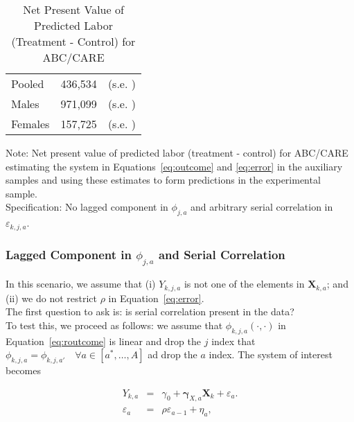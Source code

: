 \begin{table}[H] 
\begin{threeparttable}
\caption{Net Present Value of Predicted Labor (Treatment - Control) for ABC/CARE}
\label{table:yourlabel}
\centering 
\begin{tabular}{lcc} \toprule
Pooled & 436,534 & (s.e. ) \\
Males & 971,099 & (s.e. ) \\ 
Females & 157,725 & (s.e. ) \\ \bottomrule
\end{tabular}
\end{threeparttable}
\end{table}
\begin{spacing}{1}
\begin{footnotesize}
\noindent Note: Net present value of predicted labor (treatment - control) for ABC/CARE estimating the system in Equations~\eqref{eq:outcome} and \eqref{eq:error} in the auxiliary samples and using these estimates to form predictions in the experimental sample.\\ 
\noindent Specification: No lagged component in $\phi_{j,a}$ and arbitrary serial correlation in $\varepsilon_{k,j,a}$. 
\end{footnotesize}
\end{spacing}



\subsubsection{Lagged Component in $\phi_{j,a}$ and Serial Correlation} 

\noindent In this scenario, we assume that (i)  $Y_{k,j,a}$ is not one of the elements in $\bm{X}_{k,a}$; and (ii) we do not restrict $\rho$ in Equation~\eqref{eq:error}.\\

\noindent The first question to ask is: is serial correlation present in the data?\\ 

\noindent To test this, we proceed as follows: we assume that $\phi_{k,j,a} \left( \cdot, \cdot \right)$ in Equation~\eqref{eq:routcome} is linear and drop the $j$ index that $\phi_{k,j,a} = \phi_{k,j,a'} \quad \forall a \in [a^*, \ldots, A]$ ad drop the $a$ index. The system of interest becomes

\begin{eqnarray}
Y_{k,a} &=&\gamma_{0} + \bm{\gamma}_{X,a} \bm{X}_{k} + \varepsilon_{a}. \label{eq:linear1} \\
\varepsilon_{a} &=& \rho \varepsilon_{a-1} + \eta_{a}, \label{eq:linear2}
\end{eqnarray}


